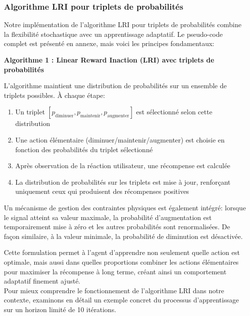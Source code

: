\subsubsection{Algorithme LRI pour triplets de probabilités}

Notre implémentation de l'algorithme LRI pour triplets de probabilités combine la flexibilité stochastique avec un apprentissage adaptatif. Le pseudo-code complet est présenté en annexe, mais voici les principes fondamentaux:

\begin{center}
    \textbf{Algorithme 1 : Linear Reward Inaction (LRI) avec triplets de probabilités}
\end{center}

L'algorithme maintient une distribution de probabilités sur un ensemble de triplets possibles. À chaque étape:
\begin{enumerate}
    \item Un triplet $[p_{\text{diminuer}}, p_{\text{maintenir}}, p_{\text{augmenter}}]$ est sélectionné selon cette distribution
    \item Une action élémentaire (diminuer/maintenir/augmenter) est choisie en fonction des probabilités du triplet sélectionné
    \item Après observation de la réaction utilisateur, une récompense est calculée
    \item La distribution de probabilités sur les triplets est mise à jour, renforçant uniquement ceux qui produisent des récompenses positives
\end{enumerate}

Un mécanisme de gestion des contraintes physiques est également intégré: lorsque le signal atteint sa valeur maximale, la probabilité d'augmentation est temporairement mise à zéro et les autres probabilités sont renormalisées. De façon similaire, à la valeur minimale, la probabilité de diminution est désactivée.

Cette formulation permet à l'agent d'apprendre non seulement quelle action est optimale, mais aussi dans quelles proportions combiner les actions élémentaires pour maximiser la récompense à long terme, créant ainsi un comportement adaptatif finement ajusté.\\

Pour mieux comprendre le fonctionnement de l'algorithme LRI dans notre contexte, examinons en détail un exemple concret du processus d'apprentissage sur un horizon limité de 10 itérations.
\small\itshape

